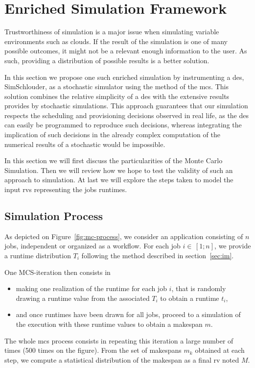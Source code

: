 \documentclass[10pt,conference,compsocconf]{IEEEtran}
\begin{document}
\section{Enriched Simulation Framework}
\label{sec:enriched-sim}

Trustworthiness of simulation is a major issue when simulating variable
environments such as clouds. If the result of the simulation is one of many
possible outcomes, it might not be a relevant enough information to the user. 
As such, providing a distribution of possible results is a better solution.

In this section we propose one such enriched simulation by instrumenting a
\ac{des}, SimSchlouder, as a stochastic simulator using the method of the
\acf{mcs}. This solution combines the relative simplicity of a \ac{des} with the
extensive results provides by stochastic simulations. This approach guarantees
that our simulation respects the scheduling and provisioning decisions observed
in real life, as the \ac{des} can easily be programmed to reproduce such
decisions, whereas integrating the implication of such decisions in the already
complex computation of the numerical results of a stochastic would be
impossible.

In this section we will first discuss the particularities of the Monte Carlo
Simulation. Then we will review how we hope to test the validity of such an
approach to simulation. At last we will explore the steps taken to model the
input \acp{rv} representing the jobs runtimes.

\subsection{Simulation Process}
As  depicted   on  Figure~\ref{fig:mc-process},  we  consider   an  application
consisting of  $n$ jobs, independent  or organized as  a workflow. For  each job
$i  \in\,[1;n]$, we provide  a runtime distribution $T_i$ following the method
described in section~\ref{sec:im}.

One MCS-iteration then consists in 
\begin{itemize}
\item making one realization of the runtime  for each job $i$, that is randomly
  drawing a runtime value from the associated $T_i$ to obtain a runtime $t_i$,
\item and once runtimes have been drawn for all jobs, proceed to a simulation
  of the execution with these runtime values to obtain a makespan $m$.
\end{itemize}
The whole \ac{mcs} process  consists in repeating this iteration a  large number
of times (500 times  on the  figure). From the  set of makespans  $m_k$ obtained
at each step, we compute  a statistical distribution of the makespan  as a final
\ac{rv} noted $M$.
\end{document}
